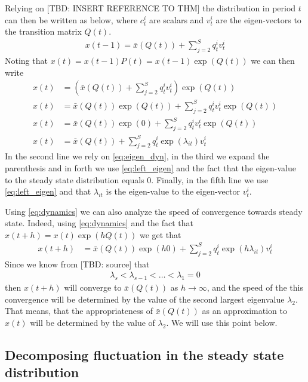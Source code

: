 Relying on [TBD: INSERT REFERENCE TO THM] the distribution in period $t$ can then be written as below, where $c_t^i$ are scalars and $v_t^i$ are the eigen-vectors to the transition matrix $Q(t)$.
\begin{align}
x(t-1)=\bar{x} \left(  Q(t) \right)+\sum_{j=2}^S q_t^i v_t^i \label{eq:eigen_dyn}
\end{align}
Noting that $x(t)=x(t-1) P(t)=x(t-1) \exp(Q(t))$ we can then write 
\begin{align}
x(t)&= \left(\bar{x} \left(  Q(t) \right)+\sum_{j=2}^S q_t^i v_t^i \right)\exp(Q(t)) \nonumber \\
x(t)&=\bar{x}\left(  Q(t) \right) \exp(Q(t))+\sum_{j=2}^S q_t^i v_t^i \exp(Q(t)) \nonumber \\
x(t)&=\bar{x}\left(  Q(t) \right) \exp(0)+\sum_{j=2}^S q_t^i v_t^i \exp(Q(t)) \nonumber \\
x(t)&=\bar{x} \left(  Q(t) \right)+\sum_{j=2}^S q_t^i \exp(\lambda_{it}) v_t^i \label{eq:dynamics}
\end{align}
In the second line we rely on \eqref{eq:eigen_dyn}, in the third we expand the parenthesis and in forth we use \eqref{eq:left_eigen} and the fact that the eigen-value to the steady state distribution equals 0. Finally, in the fifth line we use \eqref{eq:left_eigen} and that $\lambda_{it}$ is the eigen-value to the eigen-vector $v_t^i$. 

Using \eqref{eq:dynamics} we can also analyze the speed of convergence towards steady state. Indeed, using \eqref{eq:dynamics} and the fact that $x(t+h)=x(t)\exp(hQ(t))$ we get that 
\begin{align}
x(t+h)&=\bar{x} (Q(t)) \exp (h0) +\sum_{j=2}^S q_t^i \exp(h\lambda_{it}) v_t^i
\end{align}
Since we know from [TBD: source] that 
\begin{align}
\lambda_s<\lambda_{s-1}<\dots<\lambda_{1}=0
\end{align}
then $x(t+h)$ will converge to $\bar{x} (Q(t))$ as $h \rightarrow \infty$, and the speed of the this convergence will be determined by the value of the second largest eigenvalue $\lambda_2$. That means, that the appropriateness of $\bar{x}(Q(t))$ as an approximation to $x(t)$ will be determined by the value of $\lambda_2$. We will use this point below.

\subsection{Decomposing fluctuation in the steady state distribution}

